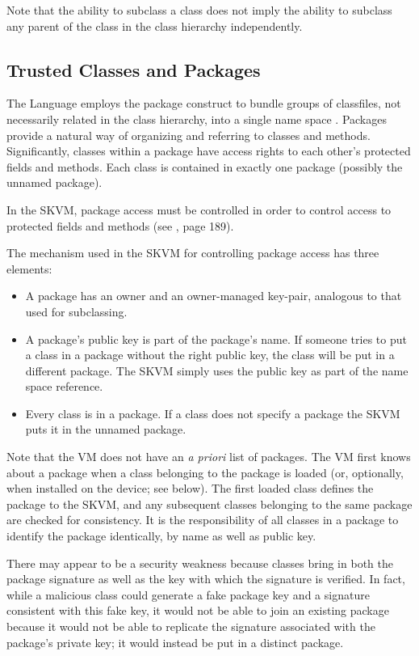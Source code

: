 \documentclass{llncs}
\begin{document}
Note that the ability to subclass a class does not imply the ability
to subclass any parent of the class in the class hierarchy
independently.

\subsection{Trusted Classes and Packages}

The Language employs the package construct to bundle groups of
classfiles, not necessarily related in the class hierarchy, into a
single name space \cite[chapter 7]{jls}. Packages provide a natural way
of organizing and referring to classes and methods. Significantly,
classes within a package have access rights to each other's protected
fields and methods. Each class is contained in exactly one package
(possibly the unnamed package).

In the SKVM, package access must be controlled in order to control
access to protected fields and methods (see \cite{mcgraw}, page 189).

The mechanism used in the SKVM for controlling package access has
three elements:
\begin{itemize}
  \item A package has an owner and an owner-managed key-pair,
  analogous to that used for subclassing.
  \item A package's public key is part of the package's name. If someone tries
  to put a class in a package without the right public key,
  the class will be put in a different package. The SKVM
  simply uses the public key as part of the name space
  reference.
  \item Every class is in a package. If a class does not specify a package the
  SKVM puts it in the unnamed package.
\end{itemize}

Note that the VM does not have an \emph{a priori} list of packages. The
VM first knows about a package when a class belonging to the package
is loaded (or, optionally, when installed on the device; see below).
The first loaded class defines the package to the SKVM, and any
subsequent classes belonging to the same package are checked for
consistency. It is the responsibility of all classes in a package
to identify the package identically, by name as well as public key.

There may appear to be a security weakness because classes bring
in both the package signature as well as the key with which the
signature is verified. In fact, while a malicious class could
generate a fake package key and a signature consistent with this
fake key, it would not be able to join an existing package because
it would not be able to replicate the signature associated with the
package's private key; it would instead be put in a distinct package.
\end{document}
